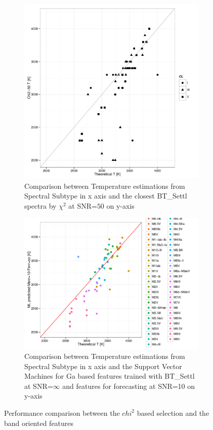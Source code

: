 \begin {figure}
 \centering
 \begin{subfigure}{.85\textwidth}
  \centering
  \includegraphics[width=13cm]{figs/T_chi50_Tst.pdf}
  \caption{Comparison between Temperature estimations from Spectral Subtype 
 in x axis and the closest BT\_Settl spectra by $\chi^2$ at SNR=$50$ on y-axis}
 \label{fig:chi2_50_spt}
 \end{subfigure}
  \begin{subfigure}{.85\textwidth}
  \centering
  \includegraphics[width=13cm]{figs/T_svm_10_TsP.pdf}
  \caption{Comparison between Temperature estimations from Spectral Subtype 
 in x axis and the Support Vector Machines for Ga based features trained with BT\_Settl 
 at SNR=$\infty$ and features for forecasting at SNR=10 on y-axis}
 \label{fig:ga_too50ga_spt}
 \end{subfigure}
 \label {fig:comp01}
 \caption{Performance comparison between the $chi^2$ based selection 
          and the band oriented features}
\end {figure}
%
%

